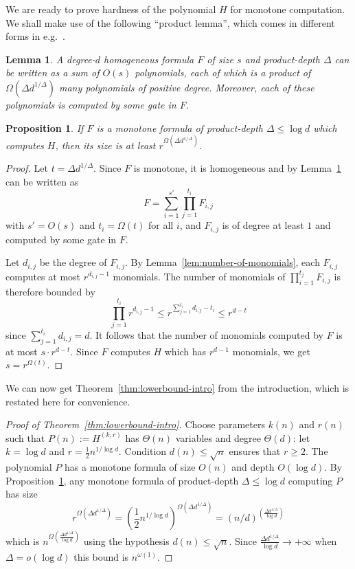 \documentclass[10pt,a4paper]{article}
\newtheorem{lemma}[theorem]{Lemma}
\newtheorem{proposition}[theorem]{Proposition}
\begin{document}
We are ready to prove hardness of the polynomial $H$ for monotone computation.
We shall make use of the following ``product lemma'', which comes in different forms in e.g.~\cite{SY, HrubesY11,Ramprasadsurvey}.

\begin{lemma}\label{lem:product-decomposition}
	A degree-$d$ homogeneous formula $F$ of size $s$ and product-depth $\Delta$
	can be written as a sum of $O(s)$ polynomials, %
	each of which
	is a product of $\Omega(\Delta d^{1/\Delta})$ many polynomials of
	positive degree. Moreover, each of these polynomials is computed by
	some gate in $F$.
\end{lemma}

\begin{proposition}
	\label{prop:hardness-of-H}
	If \(F\) is a monotone formula of product-depth \(\Delta  \leq \log d\)
	which computes \(H\), then its size is at least $r^{\Omega(\Delta d^{1/\Delta})}$.
\end{proposition}

\begin{proof}
	Let $t=\Delta d^{1/\Delta}$.
	Since $F$ is monotone, it is homogeneous and by Lemma~\ref{lem:product-decomposition} can be written as
	$$F = \sum_{i=1}^{s'} \prod_{j=1}^{t_i} F_{i,j}$$
	with $s'=O(s)$ and $t_i =\Omega(t)$ for all $i$, 
	and $F_{i,j}$ is of degree at least $1$ and computed by some gate in $F$.
	
	Let $d_{i,j}$ be the degree of $F_{i,j}$.
	By Lemma~\ref{lem:number-of-monomials}, each $F_{i,j}$ computes at most $r^{d_{i,j}-1}$ monomials.
	The number of monomials of $\prod_{i=1}^{t_j} F_{i,j}$ is therefore bounded by
	$$\prod_{j=1}^{t_i} r^{d_{i,j}-1} \leq r^{\sum_{j=1}^{t_i} d_{i,j}-t_i} \leq r^{d-t}$$
	since $\sum_{j=1}^{t_i} d_{i,j} = d$.
	It follows that the number of monomials computed by $F$ is at most $s \cdot r^{d-t}$.
	Since $F$ computes $H$ which has $r^{d-1}$ monomials, we get $s = r^{\Omega (t)}$.
\end{proof}

We can now get Theorem~\ref{thm:lowerbound-intro} from the introduction, which is restated here for convenience.

\begin{proof}[Proof of Theorem~\ref{thm:lowerbound-intro}]
	Choose parameters $k(n)$ and $r(n)$ 
	such that $P(n):=H^{(k,r)}$ has $\Theta(n)$ variables and degree $\Theta(d)$: let
	$k=\log d$ and $r=\frac{1}{2} n^{1/\log d}$.
	Condition $d(n)\leq \sqrt{n}$ ensures that $r\geqslant 2$.
	The polynomial $P$ has a monotone formula of size $O(n)$ and depth $O(\log d)$.
	By Proposition~\ref{prop:hardness-of-H}, 
	any monotone formula of product-depth $\Delta \leq \log d$ computing $P$
	has size
	$$r^{\Omega(\Delta d^{1/\Delta})} = 
	\left(\frac{1}{2} n^{1/\log d}\right)^{\Omega(\Delta d^{1/\Delta})} 
	= (n/d)^{\left( \frac{\Delta d^{1/\Delta}}{\log d} \right)}$$
	which is $n^{\Omega \left( \frac{\Delta d^{1/\Delta}}{\log d} \right)}$
	using the hypothesis $d(n)\leq \sqrt{n}$.
	Since $\frac{\Delta d^{1/\Delta}}{\log d} \rightarrow +\infty$ when $\Delta = o \left(\log d \right)$ this bound is $n^{\omega(1)}.$
\end{proof}
\end{document}
